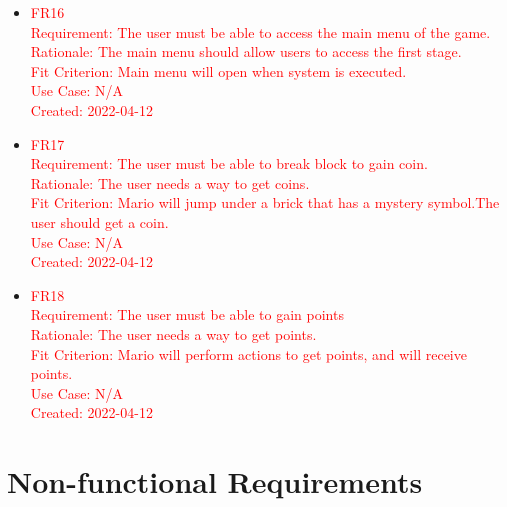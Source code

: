 \documentclass[12pt, titlepage]{article}
\begin{document}
\begin{itemize}

    \item \textcolor{red}{FR16}\\
    \textcolor{red}{Requirement: The user must be able to access the main menu of the game.\\
    Rationale: The main menu should allow users to access the first stage.\\
    Fit Criterion: Main menu will open when system is executed.\\
    Use Case: N/A\\
    Created: 2022-04-12\\}

    \item \textcolor{red}{FR17}\\
    \textcolor{red}{
    Requirement: The user must be able to break block to gain coin.\\
    Rationale: The user needs a way to get coins.\\
    Fit Criterion: Mario will jump under a brick that has a mystery symbol.The user should get a coin.\\
    Use Case: N/A\\
    Created: 2022-04-12\\
    }

    \item \textcolor{red}{FR18}\\
    \textcolor{red}{
    Requirement: The user must be able to gain points\\
    Rationale: The user needs a way to get points.\\
    Fit Criterion: Mario will perform actions to get points, and will receive points.\\
    Use Case: N/A\\
    Created: 2022-04-12\\
    }

\end{itemize}

\section{Non-functional Requirements}
\end{document}
